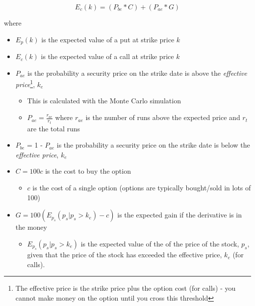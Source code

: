 \documentclass[
]{book}
\providecommand{\tightlist}{%
  \setlength{\itemsep}{0pt}\setlength{\parskip}{0pt}}
\begin{document}
\begin{equation} 
E_c(k) = (P_{be} * C) + (P_{ae} * G)
\label{eq:calls}
\end{equation}

where

\begin{itemize}
\tightlist
\item
  \(E_p(k)\) is the expected value of a put at strike price \(k\)
\item
  \(E_c(k)\) is the expected value of a call at strike price \(k\)
\item
  \(P_{ae}\) is the probability a security price on the strike date is above the
  \emph{effective price}\footnote{The effective price is the strike price plus the option cost
    (for calls) - you cannot make money on the option until you cross this
    threshold}, \(k_e\)

  \begin{itemize}
  \tightlist
  \item
    This is calculated with the Monte Carlo simulation
  \item
    \(P_{ae} = \frac{r_{ae}}{r_t}\) where \(r_{ae}\) is the number of runs above
    the expected price and \(r_t\) are the total runs
  \end{itemize}
\item
  \(P_{be}\) = 1 - \(P_{ae}\) is the probability a security price on the strike date
  is below the \emph{effective price}, \(k_e\)
\item
  \(C = 100c\) is the cost to buy the option

  \begin{itemize}
  \tightlist
  \item
    \(c\) is the cost of a single option (options are typically bought/sold in
    lots of 100)
  \end{itemize}
\item
  \(G = 100(E_{p_s}(p_s|p_s>k_e) - c)\) is the expected gain if the derivative
  is in the money

  \begin{itemize}
  \tightlist
  \item
    \(E_{p_s}(p_s|p_s>k_e)\) is the expected value of the of the price of the
    stock, \(p_s\), given that the price of the stock has exceeded the effective
    price, \(k_e\) (for calls).
  \end{itemize}
\end{itemize}
\end{document}
